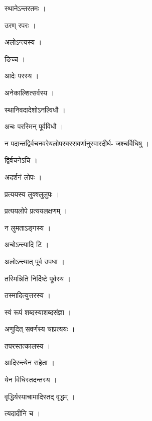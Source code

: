 \documentclass[10pt, openany]{book}
\begin{document}
\noindent स्थानेऽन्तरतमः ।

\noindent उरण् रपरः ।

\noindent अलोऽन्त्यस्य ।

\noindent ङिच्च ।

\noindent आदेः परस्य ।

\noindent अनेकाल्शित्सर्वस्य ।

\noindent स्थानिवदादेशोऽनल्विधौ ।

\noindent अचः परस्मिन् पूर्वविधौ ।

\noindent न पदान्तद्विर्वचनवरेयलोपस्वरसवर्णानुस्वारदीर्घ- जश्चर्विधिषु ।

\noindent द्विर्वचनेऽचि ।

\noindent अदर्शनं लोपः ।

\noindent प्रत्ययस्य लुक्श्लुलुपः ।

\noindent प्रत्ययलोपे प्रत्ययलक्षणम् ।

\noindent न लुमताऽङ्गस्य ।

\noindent अचोऽन्त्यादि टि ।

\noindent अलोऽन्त्यात् पूर्व उपधा ।

\noindent तस्मिन्निति निर्दिष्टे पूर्वस्य ।

\noindent तस्मादित्युत्तरस्य ।

\noindent स्वं रूपं शब्दस्याशब्दसंज्ञा ।

\noindent अणुदित् सवर्णस्य चाप्रत्ययः ।

\noindent तपरस्तत्कालस्य ।

\noindent आदिरन्त्येन सहेता ।

\noindent येन विधिस्तदन्तस्य ।

\noindent वृद्धिर्यस्याचामादिस्तद् वृद्धम् ।

\noindent त्यदादीनि च ।
\end{document}
